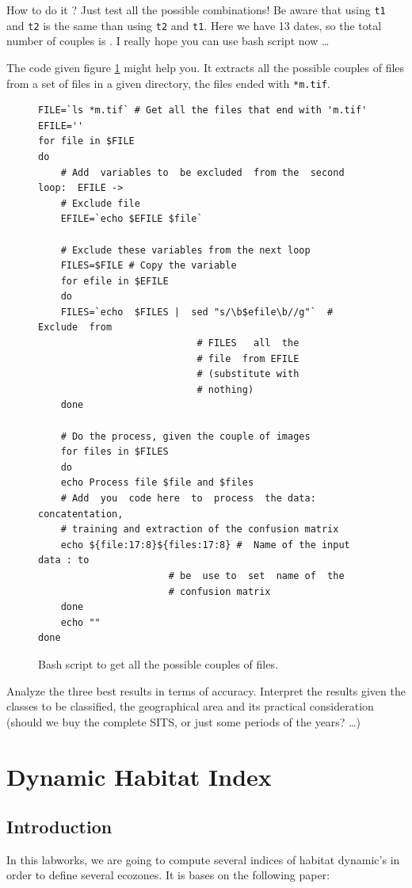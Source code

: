 \documentclass[a4paper,11pt,DIV=18]{scrartcl}
\begin{document}
How to do it ? Just test  all the possible combinations! Be aware that
using \texttt{t1}  and \texttt{t2} is  the same than  using \texttt{t2} and  \texttt{t1}. Here we  have 13
dates, so the  total number of couples is  . I really
hope you can use bash script now \ldots{}

The code given  figure \ref{org42d5855} might help you.  It extracts all
the  possible  couples  of files  from  a  set  of  files in  a  given
directory, the files ended with \texttt{*m.tif}.

\begin{figure}
\begin{verbatim}
FILE=`ls *m.tif` # Get all the files that end with 'm.tif'
EFILE=''
for file in $FILE
do
    # Add  variables to  be excluded  from the  second loop:  EFILE ->
    # Exclude file
    EFILE=`echo $EFILE $file`

    # Exclude these variables from the next loop
    FILES=$FILE # Copy the variable
    for efile in $EFILE
    do
	FILES=`echo  $FILES |  sed "s/\b$efile\b//g"`  # Exclude  from
						    # FILES   all  the
						    # file  from EFILE
						    # (substitute with
						    # nothing)
    done

    # Do the process, given the couple of images
    for files in $FILES
    do
	echo Process file $file and $files
	# Add  you  code here  to  process  the data:  concatentation,
	# training and extraction of the confusion matrix
	echo ${file:17:8}${files:17:8} #  Name of the input  data : to
				       # be  use to  set  name of  the
				       # confusion matrix
    done
    echo ""
done
\end{verbatim}
\caption{\label{org42d5855}
Bash script to get all the possible couples of files.}
\end{figure}
Analyze the three best results in terms of accuracy. Interpret the
results given the classes to be classified, the geographical area and
its practical consideration (should we buy the complete SITS, or just
some periods of the years? \ldots{})
\section{Dynamic Habitat Index}
\label{sec:org5902e12}
\subsection{Introduction}
\label{sec:org078d427}
In this labworks, we are going to compute several indices of habitat
dynamic's in order to define several ecozones. It is bases on the
following paper: 
\end{document}

